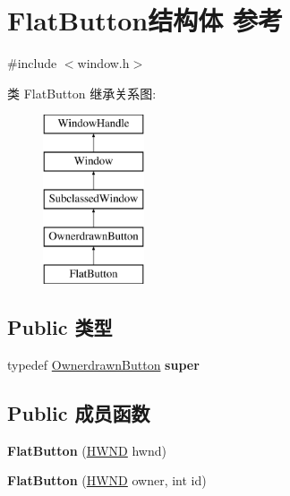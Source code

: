 \hypertarget{struct_flat_button}{}\section{Flat\+Button结构体 参考}
\label{struct_flat_button}


{\ttfamily \#include $<$window.\+h$>$}

类 Flat\+Button 继承关系图\+:\begin{figure}[H]
\begin{center}
\leavevmode
\includegraphics[height=5.000000cm]{struct_flat_button}
\end{center}
\end{figure}
\subsection*{Public 类型}
\begin{DoxyCompactItemize}
\item 
\mbox{\label{struct_flat_button_a2f8d356ada8b76a7c6174388156f0e67}} 
typedef \hyperlink{struct_ownerdrawn_button}{Ownerdrawn\+Button} {\bfseries super}
\end{DoxyCompactItemize}
\subsection*{Public 成员函数}
\begin{DoxyCompactItemize}
\item 
\mbox{\label{struct_flat_button_a9de3044fd9d7bb87ebafd826046c40dd}} 
{\bfseries Flat\+Button} (\hyperlink{interfacevoid}{H\+W\+ND} hwnd)
\item 
\mbox{\label{struct_flat_button_a52c1d7ad14572258f7a276d7e3ff3739}} 
{\bfseries Flat\+Button} (\hyperlink{interfacevoid}{H\+W\+ND} owner, int id)
\end{DoxyCompactItemize}
